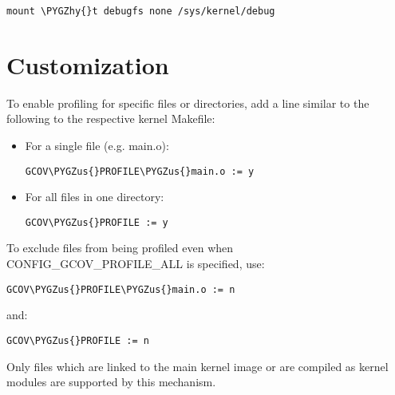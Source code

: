 \documentclass[a4paper,8pt,english]{sphinxmanual}
\def\PYGZus{\char`\_}
\def\PYGZhy{\char`\-}
\begin{document}
\begin{Verbatim}[commandchars=\\\{\}]
mount \PYGZhy{}t debugfs none /sys/kernel/debug
\end{Verbatim}


\section{Customization}
\label{dev-tools/gcov:customization}
To enable profiling for specific files or directories, add a line
similar to the following to the respective kernel Makefile:
\begin{itemize}
\item {} 
For a single file (e.g. main.o):

\begin{Verbatim}[commandchars=\\\{\}]
GCOV\PYGZus{}PROFILE\PYGZus{}main.o := y
\end{Verbatim}

\item {} 
For all files in one directory:

\begin{Verbatim}[commandchars=\\\{\}]
GCOV\PYGZus{}PROFILE := y
\end{Verbatim}

\end{itemize}

To exclude files from being profiled even when CONFIG\_GCOV\_PROFILE\_ALL
is specified, use:

\begin{Verbatim}[commandchars=\\\{\}]
GCOV\PYGZus{}PROFILE\PYGZus{}main.o := n
\end{Verbatim}

and:

\begin{Verbatim}[commandchars=\\\{\}]
GCOV\PYGZus{}PROFILE := n
\end{Verbatim}

Only files which are linked to the main kernel image or are compiled as
kernel modules are supported by this mechanism.
\end{document}
